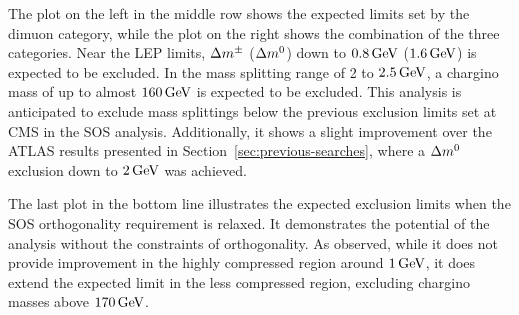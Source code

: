 The plot on the left in the middle row shows the expected limits set by the dimuon category, while the plot on the right shows the combination of the three categories. Near the LEP limits, $\Delta m^\pm$ ($\Delta m^0$) down to $0.8\,\text{Ge\hspace{-.08em}V}$ ($1.6\,\text{Ge\hspace{-.08em}V}$) is expected to be excluded. In the mass splitting range of 2 to $2.5\,\text{Ge\hspace{-.08em}V}$, a chargino mass of up to almost $160\,\text{Ge\hspace{-.08em}V}$ is expected to be excluded. This analysis is anticipated to exclude mass splittings below the previous exclusion limits set at CMS in the SOS analysis. Additionally, it shows a slight improvement over the ATLAS results presented in Section~\ref{sec:previous-searches}, where a $\Delta m^0$ exclusion down to $2\,\text{Ge\hspace{-.08em}V}$ was achieved.

The last plot in the bottom line illustrates the expected exclusion limits when the SOS orthogonality requirement is relaxed. It demonstrates the potential of the analysis without the constraints of orthogonality. As observed, while it does not provide improvement in the highly compressed region around $1\,\text{Ge\hspace{-.08em}V}$, it does extend the expected limit in the less compressed region, excluding chargino masses above $170\,\text{Ge\hspace{-.08em}V}$.

